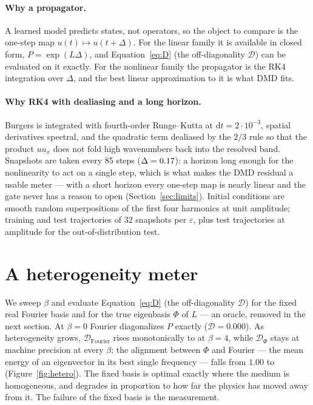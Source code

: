 \documentclass[11pt,a4paper]{article}
\newcommand{\Dm}{\mathcal{D}}
\begin{document}
\paragraph{Why a propagator.} A learned model predicts states, not operators, so the object to compare is the one-step map $u(t)\mapsto u(t+\Delta)$. For the linear family it is available in closed form, $P = \exp(L\Delta)$, and Equation~\eqref{eq:D} (the off-diagonality $\Dm$) can be evaluated on it exactly. For the nonlinear family the propagator is the RK4 integration over $\Delta$, and the best linear approximation to it is what DMD fits.

\paragraph{Why RK4 with dealiasing and a long horizon.} Burgers is integrated with fourth-order Runge–Kutta at $\mathrm{d}t = 2\cdot10^{-3}$, spatial derivatives spectral, and the quadratic term dealiased by the $2/3$ rule so that the product $u u_x$ does not fold high wavenumbers back into the resolved band. Snapshots are taken every 85 steps ($\Delta = 0.17$): a horizon long enough for the nonlinearity to act on a single step, which is what makes the DMD residual a usable meter — with a short horizon every one-step map is nearly linear and the gate never has a reason to open (Section~\ref{sec:limits}). Initial conditions are smooth random superpositions of the first four harmonics at unit amplitude; \wpNtr{} training and \wpNte{} test trajectories of 32 snapshots per $\varepsilon$, plus \wpNte{} test trajectories at amplitude \wpAmpOod{} for the out-of-distribution test.

\section{A heterogeneity meter}\label{sec:hetero}
We sweep $\beta$ and evaluate Equation~\eqref{eq:D} (the off-diagonality $\Dm$) for the fixed real Fourier basis and for the true eigenbasis $\Phi$ of $L$ — an oracle, removed in the next section. At $\beta=0$ Fourier diagonalizes $P$ exactly ($\Dm = 0.000$). As heterogeneity grows, $\Dm_{\mathrm{Fourier}}$ rises monotonically to \wpOneDmax{} at $\beta=4$, while $\Dm_\Phi$ stays at machine precision at every $\beta$; the alignment between $\Phi$ and Fourier — the mean energy of an eigenvector in its best single frequency — falls from $1.00$ to \wpOneAlignMin{} (Figure~\ref{fig:hetero}). The fixed basis is optimal exactly where the medium is homogeneous, and degrades in proportion to how far the physics has moved away from it. The failure of the fixed basis is the measurement.
\end{document}
